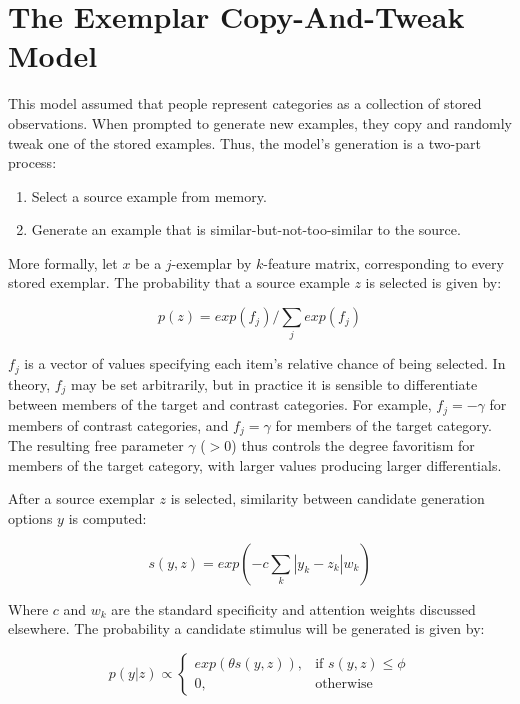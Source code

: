 \documentclass[12pt]{article}
\begin{document}
\section{The Exemplar Copy-And-Tweak Model}

This model assumed that people represent categories as a collection of stored observations. When prompted to generate new examples, they copy and randomly tweak one of the stored examples. Thus, the model's generation is a two-part process:

\begin{enumerate}
  \item Select a source example from memory.
  \item Generate an example that is similar-but-not-too-similar to the source.
\end{enumerate}

More formally, let $x$ be a $j$-exemplar by $k$-feature matrix, corresponding to every stored exemplar. The probability that a source example $z$ is selected is given by:

\begin{equation}
  p(z) = exp(f_j) / \sum_j{ exp(f_j) }
\end{equation}

$f_j$ is a vector of values specifying each item's relative chance of being selected. In theory, $f_j$ may be set arbitrarily, but in practice it is sensible to differentiate between members of the target and contrast categories. For example, $f_j = -\gamma$ for members of contrast categories, and $f_j = \gamma$ for members of the target category. The resulting free parameter $\gamma$ ($>0$) thus controls the degree favoritism for members of the target category, with larger values producing larger differentials.

After a source exemplar $z$ is selected, similarity between candidate generation options $y$ is computed:

\begin{equation}
  s(y,z) = exp( -c \sum_k{|y_k - z_k|w_k})
\end{equation}

Where $c$ and $w_k$ are the standard specificity and attention weights discussed elsewhere. The probability a candidate stimulus will be generated is given by:

\begin{equation}
  p(y|z) \propto  
  \begin{cases}
     exp(\theta s(y,z)), & \text{if } s(y,z) \leq \phi \\
    0, & \text{otherwise}
  \end{cases}
  \label{eq:generation-choice}
\end{equation}
\end{document}
